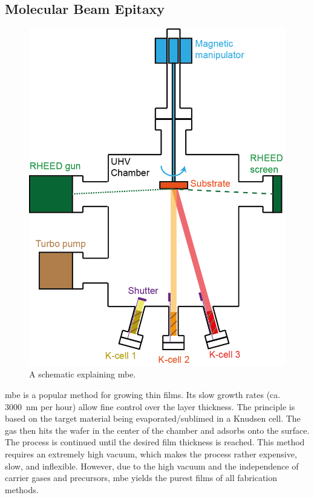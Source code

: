 \subsection{Molecular Beam Epitaxy} 
\begin{figure}
    \centering
    \includegraphics[scale=.7]{03_fabrication/fig/molecular_beam_epitaxy.png}
    \caption{A schematic explaining \gls{mbe}. \cite{Zeljkovic2015}}
    \label{fig:fabrication_mbe}
\end{figure}
\Gls{mbe} is a popular method for growing thin films. Its slow growth rates (ca. \SI{3000}{\nano\meter} per hour) allow fine control over the layer thickness. The principle is based on the target material being evaporated/sublimed in a Knudsen cell. The gas then hits the wafer in the center of the chamber and adsorbs onto the surface. The process is continued until the desired film thickness is reached. This method requires an extremely high vacuum, which makes the process rather expensive, slow, and inflexible.  However, due to the high vacuum and the independence of carrier gases and precursors, \gls{mbe} yields the purest films of all fabrication methods.
